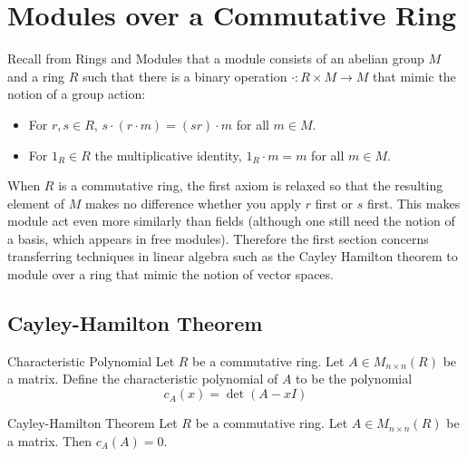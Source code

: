 \documentclass[a4paper]{article}
\begin{document}
\pagebreak
\section{Modules over a Commutative Ring}
Recall from Rings and Modules that a module consists of an abelian group $M$ and a ring $R$ such that there is a binary operation $\cdot:R\times M\to M$ that mimic the notion of a group action: 
\begin{itemize}
\item For $r,s\in R$, $s\cdot(r\cdot m)=(sr)\cdot m$ for all $m\in M$. 
\item For $1_R\in R$ the multiplicative identity, $1_R\cdot m=m$ for all $m\in M$. 
\end{itemize}

When $R$ is a commutative ring, the first axiom is relaxed so that the resulting element of $M$ makes no difference whether you apply $r$ first or $s$ first. This makes module act even more similarly than fields (although one still need the notion of a basis, which appears in free modules). Therefore the first section concerns transferring techniques in linear algebra such as the Cayley Hamilton theorem to module over a ring that mimic the notion of vector spaces. 

\subsection{Cayley-Hamilton Theorem}
\begin{defn}{Characteristic Polynomial}{} Let $R$ be a commutative ring. Let $A\in M_{n\times n}(R)$ be a matrix. Define the characteristic polynomial of $A$ to be the polynomial $$c_A(x)=\det(A-xI)$$
\end{defn}

\begin{thm}{Cayley-Hamilton Theorem}{} Let $R$ be a commutative ring. Let $A\in M_{n\times n}(R)$ be a matrix. Then $c_A(A)=0$. 
\end{thm}
\end{document}
